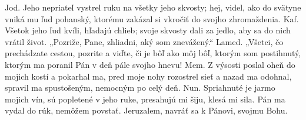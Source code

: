 Jod. Jeho nepriateľ vystrel ruku
na všetky jeho skvosty;
hej, videl, ako do svätyne
vniká mu ľud pohanský,
ktorému zakázal si vkročiť
do svojho zhromaždenia.
\versseparator
Kaf. 
Všetok jeho ľud kvíli,
hľadajú chlieb;
svoje skvosty dali za jedlo,
aby sa do nich vrátil život.
„Pozriže, Pane, zhliadni,
aký som znevážený.“
\versseparator
Lamed. 
„Všetci, čo prechádzate cestou,
pozrite a viďte,
či je bôľ ako môj bôľ,
ktorým som postihnutý,
ktorým ma poranil Pán
v deň pále svojho hnevu!
\versseparator
Mem.
Z výsosti poslal oheň
do mojich kostí a pokarhal ma,
pred moje nohy rozostrel sieť
a nazad ma odohnal,
spravil ma spustošeným,
nemocným po celý deň.
\versseparator
Nun.
Spriahnuté je jarmo mojich vín,
sú popletené v jeho ruke,
presahujú mi šiju,
klesá mi sila.
Pán ma vydal do rúk,
nemôžem povstať.
\versseparator
Jeruzalem, navráť sa k Pánovi, svojmu Bohu.
